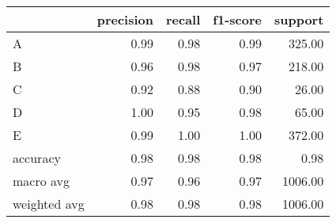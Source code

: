 \begin{tabular}{|l|r|r|r|r|}
\hline
{} &  precision &  recall &  f1-score &  support \\
\hline
A            &       0.99 &    0.98 &      0.99 &   325.00 \\
B            &       0.96 &    0.98 &      0.97 &   218.00 \\
C            &       0.92 &    0.88 &      0.90 &    26.00 \\
D            &       1.00 &    0.95 &      0.98 &    65.00 \\
E            &       0.99 &    1.00 &      1.00 &   372.00 \\
accuracy     &       0.98 &    0.98 &      0.98 &     0.98 \\
macro avg    &       0.97 &    0.96 &      0.97 &  1006.00 \\
weighted avg &       0.98 &    0.98 &      0.98 &  1006.00 \\
\hline
\end{tabular}

